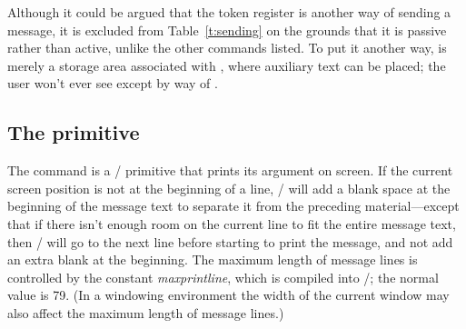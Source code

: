 Although it could be argued that the token register  is
another way of sending a message, it is excluded from
Table~\ref{t:sending} on the grounds that it is passive rather than
active, unlike the other commands listed. To put it another way,
 is merely a storage area associated with ,
where auxiliary text can be placed; the user won't ever see
 except by way of .

\subsection{The  primitive}\label{ss:message}

The  command is a \tex/ primitive that prints its argument
on screen.  If the current screen position is not at the beginning of
a line, \tex/ will add a blank space at the beginning of the message
text to separate it from the preceding material---except that if there
isn't enough room on the current line to fit the entire message text,
then \tex/ will go to the next line before starting to print the
message, and not add an extra blank at the beginning. The maximum
length of message lines is controlled by the constant {\it
max\underscore print\underscore line}, which is compiled into \tex/;
the normal value is 79. (In a windowing environment the width of the
current window may also affect the maximum length of message lines.)

